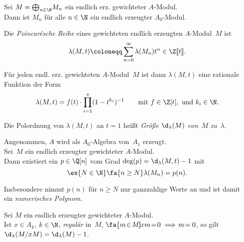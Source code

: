 \documentclass{cheat-sheet}
\begin{document}
\begin{prop}
  Sei $M = {\bigoplus}_{n \in \N} M_n$ ein endlich erz. gewichteter $A$-Modul. \\
  Dann ist $M_n$ für alle $n \in \N$ ein endlich erzeugter $A_0$-Modul.
\end{prop}

\begin{defn}
  Die \emph{Poincarésche Reihe} eines gewichteten endlich erzeugten $A$-Modul~$M$ ist
  \[
    \lambda (M, t) \coloneqq \sum_{n=0}^\infty \lambda(M_n) t^n \in \Z \llbracket t \rrbracket.
  \]
\end{defn}


\begin{satz}
  Für jeden endl. erz. gewichteten $A$-Modul~$M$ ist dann $\lambda(M, t)$ eine rationale Funktion der Form
  \[
    \lambda(M, t) = f(t) \cdot \prod_{i=1}^s (1 - t^{k_i})^{-1} \qquad
    \text{mit } f \in \Z [t], \text{ und } k_i \in \N.
  \]
\end{satz}

\begin{defn}
  Die Polordnung von $\lambda(M, t)$ an $t = 1$ heißt \emph{Größe} $\d_\lambda(M)$ \textit{von}~$M$ \textit{zu}~$\lambda$.
\end{defn}

\begin{prop}
  Angenommen, $A$ wird als $A_0$-Algebra von~$A_1$ erzeugt. \\
  Sei~$M$ ein endlich erzeugter gewichteter $A$-Modul. \\
  Dann existiert ein $p \in \Q [n]$ vom Grad $\deg(p) = \d_\lambda(M, t) - 1$ mit
  \[
    \ex{N \in \N} \fa{n \geq N} \lambda(M_n) = p(n).
  \]
\end{prop}

\begin{bem}
  Insbesondere nimmt $p(n)$ für $n \geq N$ nur ganzzahlige Werte an und ist damit ein \textit{numerisches Polynom}.
\end{bem}


\begin{prop}
  Sei $M$ ein endlich erzeugter gewichteter $A$-Modul. \\
  Ist $x \in A_k$, $k \in \N$, \textit{regulär} in~$M$, \dh{} $\fa{m \!\in\! M\!}\! xm \!=\! 0 \implies \!m\! = 0$, so gilt $\d_\lambda(M / xM) = \d_\lambda(M) - 1$.
\end{prop}
\end{document}
